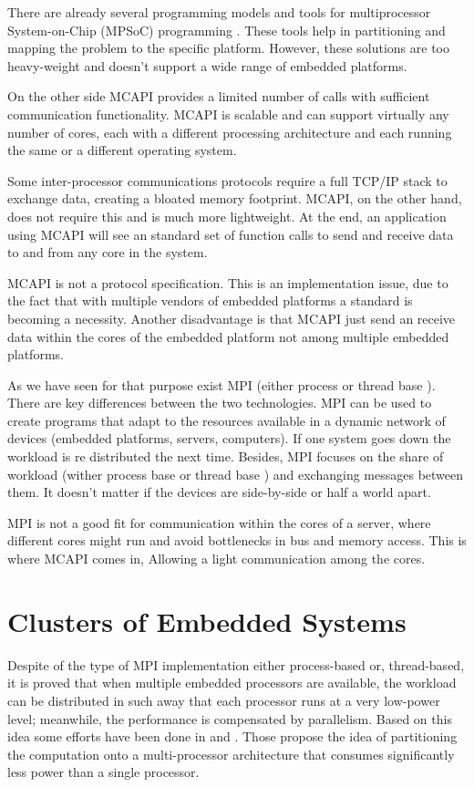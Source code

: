 There are already several programming models and tools for multiprocessor
System-on-Chip (MPSoC) programming \cite{Wolf} \cite{Matilainen}. These tools
help in partitioning and mapping the problem to the specific platform.
However, these solutions are too heavy-weight and doesn't support a wide range
of embedded platforms. 

On the other side MCAPI provides a limited number of calls with sufficient
communication functionality. MCAPI is scalable and can support virtually any
number of cores, each with a different processing architecture and each running
the same or a different operating system.

Some inter-processor communications protocols \cite{Wolf} require a full TCP/IP
stack to exchange data, creating a bloated memory footprint. MCAPI, on the
other hand, does not require this and is much more lightweight. At the end, an
application using MCAPI will see an standard set of function calls to send and
receive data to and from any core in the system. 

MCAPI is not a protocol specification. This
is an implementation issue, due to the fact that with multiple vendors of
embedded platforms a standard is becoming a necessity. Another disadvantage is
that MCAPI just send an receive data within the cores of the embedded platform
not among multiple embedded platforms. 

As we have seen for that purpose exist MPI (either process or thread base ).
There are key differences between the two technologies. MPI can be used to
create programs that adapt to the resources available in a dynamic network of
devices (embedded platforms, servers, computers). If one system goes down the
workload is re distributed the next time. Besides, MPI focuses on the share of
workload (wither process base or thread base ) and exchanging messages between
them. It doesn't matter if the devices are side-by-side or half a world apart. 

MPI is not a good fit for communication within the cores of a
server, where different cores might run and avoid bottlenecks in bus and memory
access. This is where MCAPI comes in, Allowing a light communication among the
cores.

\section{Clusters of Embedded Systems}

Despite of the type of MPI implementation either process-based or,
thread-based, it is proved that when multiple embedded processors are
available, the workload can be distributed in such away that each processor
runs at a very low-power level; meanwhile, the performance is compensated by
parallelism.  Based on this idea some efforts have been done in \cite{Liu} and
\cite{Weglarz}. Those propose the idea of partitioning the computation onto a
multi-processor architecture that consumes significantly less power than a
single processor.

